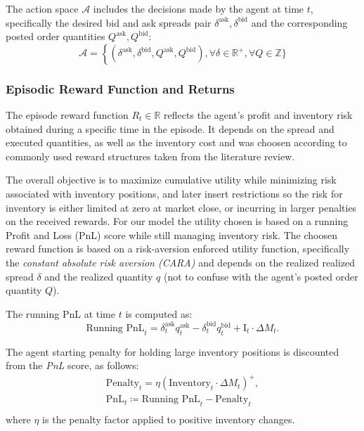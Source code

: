 The action space $\mathcal{A}$ includes the decisions made by the agent at time $t$, specifically the desired bid and ask spreads pair $\delta^{\text{ask}}, \delta^{\text{bid}}$ and the corresponding posted order quantities $Q^{\text{ask}}, Q^{\text{bid}}$:
$$
\mathcal{A} = \left\{ (\delta^{\text{ask}}, \delta^{\text{bid}}, Q^{\text{ask}}, Q^{\text{bid}}), \forall \delta \in \mathbb{R}^+, \forall Q \in \mathbb{Z}\} \right.
$$

\subsubsection{Episodic Reward Function and Returns}

The episode reward function $R_t \in \mathbb{R}$ reflects the agent's profit and inventory risk obtained during a specific time in the episode. It depends on the spread and executed quantities, as well as the inventory cost and was choosen according to commonly used reward structures taken from the literature review.

The overall objective is to maximize cumulative utility while minimizing risk associated with inventory positions, and later insert restrictions so the risk for inventory is either limited at zero at market close, or incurring in larger penalties on the received rewards. For our model the utility chosen is based on a running Profit and Loss (PnL) score while still managing inventory risk. The choosen reward function is based on a risk-aversion enforced utility function, specifically the \textit{constant absolute risk aversion (CARA)} and depends on the realized realized spread $\delta$ and the realized quantity $q$ (not to confuse with the agent's posted order quantity $Q$).

The running PnL at time $t$ is computed as:
\[
    \text{Running PnL}_t = \delta_t^{\text{ask}} q_t^{\text{ask}} - \delta_t^{\text{bid}} q_t^{\text{bid}} + \text{I}_t \cdot \Delta M_t.
\]

The agent starting penalty for holding large inventory positions is discounted from the \textit{PnL} score, as follows:
\begin{gather*}
    \text{Penalty}_t = \eta \left( \text{Inventory}_t \cdot \Delta M_t \right)^+,\\
    \text{PnL}_t \coloneqq \text{Running PnL}_t - \text{Penalty}_t\\
\end{gather*}
where \( \eta \) is the penalty factor applied to positive inventory changes.

